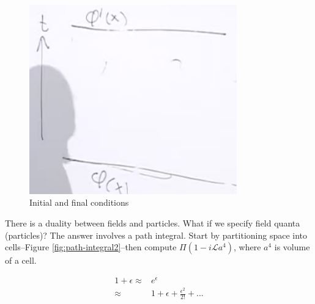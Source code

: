 \documentclass[]{article}
\begin{document}
\begin{figure}[H]
	\caption{Initial and final conditions}\label{fig:path-integral1}
	\includegraphics[width=0.8\textwidth]{path-integral1}
\end{figure}

There is a duality between fields and particles. What if we specify field quanta (particles)? The answer involves a path integral. Start by partitioning space into cells--Figure \ref{fig:path-integral2}--then compute $\Pi(1-i\mathcal{L}a^4)$, where $a^4$ is volume of a cell.

\begin{align*}
	1 + \epsilon \approx &e^\epsilon\\
	\approx& 1 + \epsilon + \frac{\epsilon^2}{2!} +...\\
\end{align*}
\end{document}
